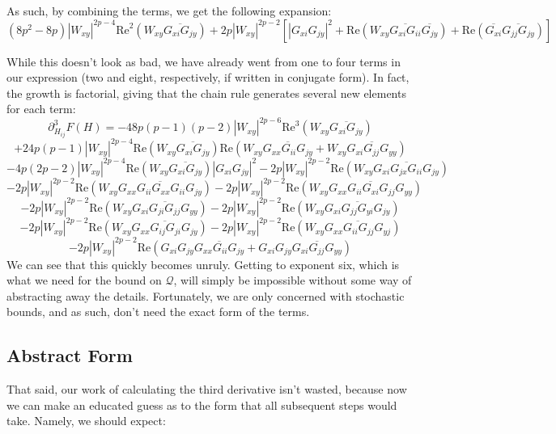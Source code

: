 \documentclass[11pt]{article}
\begin{document}
\noindent As such, by combining the terms, we get the following expansion: $$(8p^2-8p)|W_{xy}|^{2p-4}\text{Re}^2\left(W_{xy}\overline{G_{xi}G_{jy}}\right) +2p|W_{xy}|^{2p-2}\left[|G_{xi}G_{jy}|^2+\text{Re}\left(W_{xy}\overline{G_{xi}G_{ii}}\overline{G_{jy}}\right)+\text{Re}\left(\overline{G_{xi}}\overline{G_{jj}G_{jy}}\right)\right]$$

\noindent While this doesn't look as bad, we have already went from one to four terms in our expression (two and eight, respectively, if written in conjugate form). In fact, the growth is factorial, giving that the chain rule generates several new elements for each term: 
$$\partial_{H_{ij}}^3F(H) = -48p(p-1)(p-2)|W_{xy}|^{2p-6}\text{Re}^3\left(W_{xy}\overline{G_{xi}G_{jy}}\right)$$ $$+24p(p-1)|W_{xy}|^{2p-4}\text{Re}\left(W_{xy}\overline{G_{xi}G_{jy}}\right)\text{Re}\left(W_{xy}\overline{G_{xx}G_{ii}G_{jy}}+W_{xy}\overline{G_{xi}G_{jj}G_{yy}}\right)$$ $$-4p(2p-2)|W_{xy}|^{2p-4}\text{Re}\left(W_{xy}\overline{G_{xi}G_{jy}}\right)|G_{xi}G_{jy}|^2-2p|W_{xy}|^{2p-2}\text{Re}\left(W_{xy}\overline{G_{xi}G_{jx}G_{ii}G_{jy}}\right)$$ $$-2p|W_{xy}|^{2p-2}\text{Re}\left(W_{xy}\overline{G_{xx}G_{ii}G_{xx}G_{ii}G_{jy}}\right)-2p|W_{xy}|^{2p-2}\text{Re}\left(W_{xy}\overline{G_{xx}G_{ii}G_{xi}G_{jj}G_{yy}}\right)$$ $$-2p|W_{xy}|^{2p-2}\text{Re}\left(W_{xy}\overline{G_{xi}G_{ji}G_{jj}G_{yy}}\right)-2p|W_{xy}|^{2p-2}\text{Re}\left(W_{xy}\overline{G_{xi}G_{jj}G_{yi}G_{jy}}\right)$$ 
$$-2p|W_{xy}|^{2p-2}\text{Re}\left(W_{xy}\overline{G_{xx}G_{ij}G_{ji}G_{jy}}\right)-2p|W_{xy}|^{2p-2}\text{Re}\left(W_{xy}\overline{G_{xx}G_{ii}G_{jj}G_{yj}}\right)$$ 
$$-2p|W_{xy}|^{2p-2}\text{Re}\left(G_{xi}G_{jy}\overline{G_{xx}G_{ii}G_{jy}}+G_{xi}G_{jy}\overline{G_{xi}G_{jj}G_{yy}}\right)$$
We can see that this quickly becomes unruly. Getting to exponent six, which is what we need for the bound on $\mathcal{Q}$, will simply be impossible without some way of abstracting away the details. Fortunately, we are only concerned with stochastic bounds, and as such, don't need the exact form of the terms. 

\subsection*{Abstract Form}
That said, our work of calculating the third derivative isn't wasted, because now we can make an educated guess as to the form that all subsequent steps would take. Namely, we should expect: 
\end{document}
